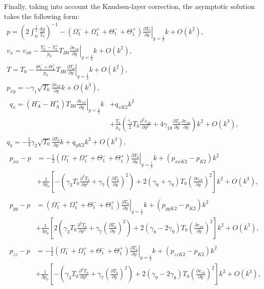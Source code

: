 \documentclass[]{jfm}
\newcommand{\dd}{\mathrm{d}}
\newcommand{\pder}[2][]{\frac{\partial#1}{\partial#2}}
\newcommand{\pderdual}[2][]{\frac{\partial^2#1}{\partial#2^2}}
\newcommand{\OO}[1]{O\left(#1\right)}
\begin{document}
Finally, taking into account the Knudsen-layer correction, the asymptotic solution takes the following form:
\begin{gather}
    p = \left( 2\int_{0}^\frac12\frac{\dd{y}}{T_0} \right)^{-1}
        - (\Omega_1^-+\Omega_1^+ + \Theta_1^-+\Theta_1^+)\left.\pder[T_0]{y}\right|_{y=\frac12}k + \OO{k^2}, \label{eq:Hilbert_p}\\
    v_x = v_{x0} - \frac{Y_0^--Y_0^+}{p_0}T_{B0}\left.\pder[v_{x0}]{y}\right|_{y=\frac12}k + \OO{k^2}, \label{eq:Hilbert_U}\\
    T = T_0 - \frac{\Theta_1^-+\Theta_1^+}{p_0}T_{B0}\left.\pder[T_0]{y}\right|_{y=\frac12}k + \OO{k^2}, \label{eq:Hilbert_T}\\
    p_{xy} = -\gamma_1\sqrt{T_0}\pder[v_{x0}]{y}k + \OO{k^3}, \label{eq:Hilbert_Pxy}\\
    \begin{aligned}
        q_x = (H_A^--H_A^+)T_{B0}\left.\pder[v_{x0}]{y}\right|_{y=\frac12}k &+ q_{xK2}k^2 \\
        &+ \frac{T_0}{p_0}\left(\frac{\gamma_3}2 T_0 \pderdual[v_{x0}]{y}
        + 4\gamma_{10} \pder[T_0]{y}\pder[v_{x0}]{y}\right)k^2 + \OO{k^3},
    \end{aligned}\label{eq:Hilbert_Qx}\\
    q_y = -\frac54\gamma_2\sqrt{T_0}\pder[T_0]{y}k + q_{yK2}k^2 + \OO{k^3}, \label{eq:Hilbert_Qy}\\
    \begin{aligned}
    p_{xx} - p &= -\frac12 (\Omega_1^-+\Omega_1^+ + \Theta_1^-+\Theta_1^+)\left.\pder[T_0]{y}\right|_{y=\frac12}k
        + (p_{xxK2}-p_{K2})k^2 \\
        &+ \frac1{3p_0}\left[-\left(\gamma_3 T_0 \pderdual[T_0]{y} + \gamma_7\left(\pder[T_0]{y}\right)^2\right)
        + 2(\gamma_8+\gamma_9)T_0\left(\pder[v_{x0}]{y}\right)^2\right]k^2 + \OO{k^3},
    \end{aligned}\label{eq:Hilbert_Pxx}\\
    \begin{aligned}
    p_{yy} - p &= (\Omega_1^-+\Omega_1^+ + \Theta_1^-+\Theta_1^+)\left.\pder[T_0]{y}\right|_{y=\frac12}k
        + (p_{yyK2}-p_{K2})k^2 \\
        &+ \frac1{3p_0}\left[2\left(\gamma_3 T_0 \pderdual[T_0]{y} + \gamma_7\left(\pder[T_0]{y}\right)^2\right)
        + 2(\gamma_8-2\gamma_9)T_0\left(\pder[v_{x0}]{y}\right)^2\right]k^2 + \OO{k^3},
    \end{aligned}\label{eq:Hilbert_Pyy}\\
    \begin{aligned}
    p_{zz} - p &= -\frac12 (\Omega_1^-+\Omega_1^+ + \Theta_1^-+\Theta_1^+)\left.\pder[T_0]{y}\right|_{y=\frac12}k
        + (p_{zzK2}-p_{K2})k^2 \\
        &+ \frac1{3p_0}\left[-\left(\gamma_3 T_0 \pderdual[T_0]{y} + \gamma_7\left(\pder[T_0]{y}\right)^2\right)
        + 2(\gamma_9-2\gamma_8)T_0\left(\pder[v_{x0}]{y}\right)^2\right]k^2 + \OO{k^3},
    \end{aligned}\label{eq:Hilbert_Pzz}
\end{gather}
\end{document}
